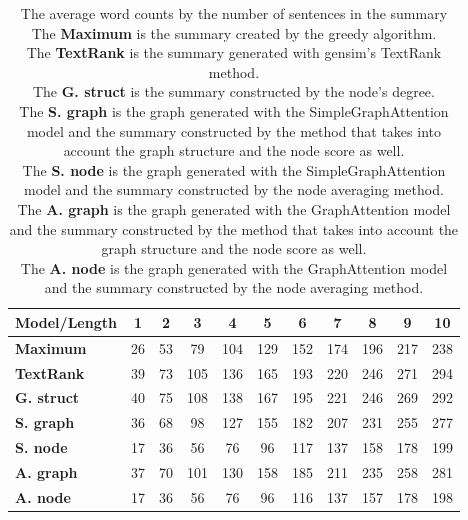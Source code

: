 \begin{table}[!ht]
	\centering
	\begin{tabular}{| l | c | c | c | c | c | c | c | c | c | c |}
		\hline
		\textbf{Model/Length}&\textbf{1}&\textbf{2}&\textbf{3}&\textbf{4}&\textbf{5}&\textbf{6}&\textbf{7}&\textbf{8}&\textbf{9}&\textbf{10} \\ \hline \hline
		\textbf{Maximum}&26&53&79&104&129&152&174&196&217&238 \\ \hline
		\textbf{TextRank}&39&73&105&136&165&193&220&246&271&294 \\ \hline
		\textbf{G. struct}&40&75&108&138&167&195&221&246&269&292 \\ \hline
		\textbf{S. graph}&36&68&98&127&155&182&207&231&255&277 \\ \hline
		\textbf{S. node}&17&36&56&76&96&117&137&158&178&199 \\ \hline
		\textbf{A. graph}&37&70&101&130&158&185&211&235&258&281 \\ \hline
		\textbf{A. node}&17&36&56&76&96&116&137&157&178&198 \\ \hline
	\end{tabular}
	\caption{The average word counts by the number of sentences in the summary
		\\ The \textbf{Maximum} is the summary created by the greedy algorithm.
		\\ The \textbf{TextRank} is the summary generated with gensim's TextRank method. 
		\\The \textbf{G. struct} is the summary constructed by the node's degree.
		\\ The \textbf{S. graph} is the graph generated with the SimpleGraphAttention model and the summary constructed by the method that takes into account the graph structure and the node score as well.
		\\ The \textbf{S. node} is the graph generated with the SimpleGraphAttention model and the summary constructed by the node averaging method.
		\\ The \textbf{A. graph} is the graph generated with the GraphAttention model and the summary constructed by the method that takes into account the graph structure and the node score as well.
		 \\ The \textbf{A. node} is the graph generated with the GraphAttention model and the summary constructed by the node averaging method.}
	\label{tab:word_count}
\end{table}

\FloatBarrier

